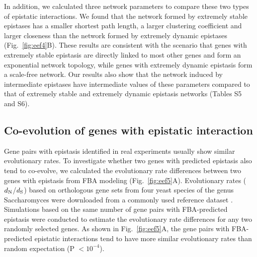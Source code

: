 \documentclass[10pt]{article}
\newcommand{\Fig}{Fig.}
\newcommand{\citep}{\cite}
\begin{document}

In addition, we calculated three network parameters to compare these
two types of epistatic interactions. We found that the network formed
by extremely stable epistases has a smaller shortest path length, a
larger clustering coefficient and larger closeness than the network
formed by extremely dynamic epistases (\Fig~\ref{fig:eef4}B). These results are
consistent with the scenario that genes with extremely stable
epistasis are directly linked to most other genes and form an
exponential network topology, while genes with extremely dynamic
epistasis form a scale-free network. Our results also show that the
network induced by intermediate epistases have intermediate values of
these parameters compared to that of extremely stable and extremely
dynamic epistasis networks (Tables S5 and S6).

\subsection*{Co-evolution of genes with epistatic interaction}

Gene pairs with epistasis identified in real experiments usually show
similar evolutionary rates. To investigate whether two genes with
predicted epistasis also tend to co-evolve, we calculated the
evolutionary rate differences between two genes with epistasis from
FBA modeling (\Fig~\ref{fig:eef5}A). Evolutionary rates
(${d_\textnormal{N}}$/${d_\textnormal{S}}$) based on orthologous gene
sets
from four yeast species of the genus Saccharomyces were downloaded
from a commonly used reference dataset \citep{Wall2005}. Simulations
based on the same number of gene pairs with FBA-predicted epistasis
were conducted to estimate the evolutionary rate differences for any
two randomly selected genes. As shown in \Fig~\ref{fig:eef5}A, the gene pairs
with FBA-predicted epistatic interactions tend to have more similar
evolutionary rates than random expectation (P $< 10^{-4}$).


\end{document}
